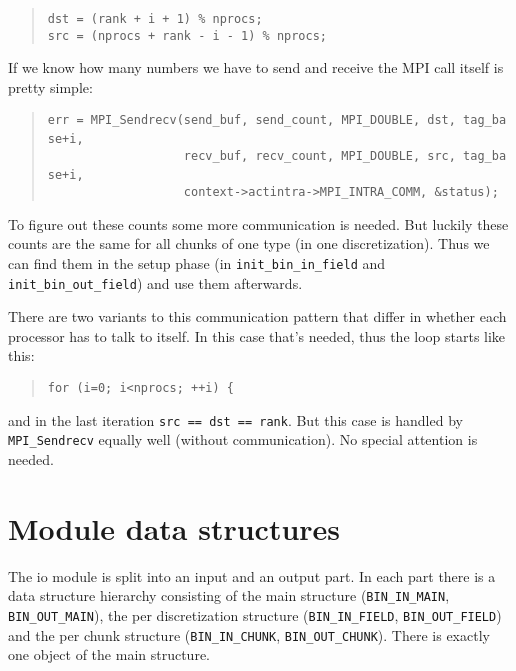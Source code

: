 \begin{quote}
\texttt{dst~=~(rank~+~i~+~1)~{\%}~nprocs;~}~\\
 \texttt{src~=~(nprocs~+~rank~-~i~-~1)~{\%}~nprocs; }
\end{quote}
If we know how many numbers we have to send and receive the MPI call
itself is pretty simple: 

\begin{quote}
\texttt{err~=~MPI{\_}Sendrecv(send{\_}buf,~send{\_}count,~MPI{\_}DOUBLE,~dst,~tag{\_}base+i,~}~\\
 \texttt{~~~~~~~~~~~~~~~~~~~recv{\_}buf,~recv{\_}count,~MPI{\_}DOUBLE,~src,~tag{\_}base+i,~}~\\
 \texttt{~~~~~~~~~~~~~~~~~~~context->actintra->MPI{\_}INTRA{\_}COMM,~{\&}status); }
\end{quote}
To figure out these counts some more communication is needed. But
luckily these counts are the same for all chunks of one type (in one
discretization). Thus we can find them in the setup phase (in \texttt{init{\_}bin{\_}in{\_}field}
and \texttt{init{\_}bin{\_}out{\_}field}) and use them afterwards.

There are two variants to this communication pattern that differ in
whether each processor has to talk to itself. In this case that's
needed, thus the loop starts like this: 

\begin{quote}
\texttt{for~(i=0;~i<nprocs;~++i)~{\{} }
\end{quote}
and in the last iteration \texttt{src == dst == rank}. But this case
is handled by \texttt{MPI{\_}Sendrecv} equally well (without communication).
No special attention is needed.


\section{Module data structures}

The io module is split into an input and an output part. In each part
there is a data structure hierarchy consisting of the main structure
(\texttt{BIN{\_}IN{\_}MAIN}, \texttt{BIN{\_}OUT{\_}MAIN}),
the per discretization structure (\texttt{BIN{\_}IN{\_}FIELD},
\texttt{BIN{\_}OUT{\_}FIELD}) and the per chunk structure (\texttt{BIN{\_}IN{\_}CHUNK},
\texttt{BIN{\_}OUT{\_}CHUNK}). There is exactly one object of
the main structure.



